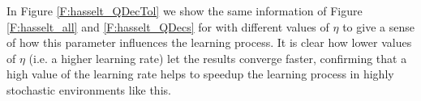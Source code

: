 \documentclass[conference]{IEEEtran}
\begin{document}
In Figure \ref{F:hasselt_QDecTol} we show the same information of Figure \ref{F:hasselt_all} and \ref{F:hasselt_QDecs} for \alg with different values of $\eta$ to give a sense of how this parameter influences the learning process. It is clear how lower values of $\eta$ (i.e. a higher learning rate) let the results converge faster, confirming that a high value of the learning rate helps to speedup the learning process in highly stochastic environments like this.

\begin{figure}[t]
\begin{minipage}{\columnwidth}
\centering
  \hspace{-.5cm}

\end{minipage}
\end{figure}
\end{document}
